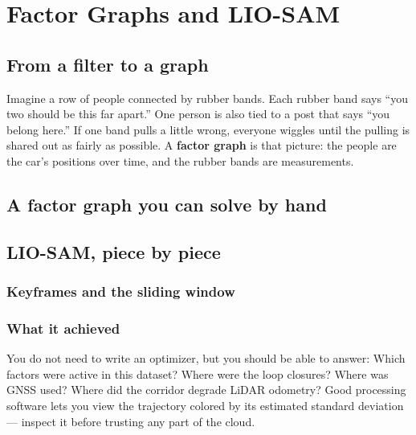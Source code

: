 \chapter{Factor Graphs and LIO-SAM}

\section{From a filter to a graph}

\begin{kid}
Imagine a row of people connected by rubber bands. Each rubber band says ``you two should be this far apart.'' One person is also tied to a post that says ``you belong here.'' If one band pulls a little wrong, everyone wiggles until the pulling is shared out as fairly as possible. A \textbf{factor graph} is that picture: the people are the car's positions over time, and the rubber bands are measurements.
\end{kid}


\section{A factor graph you can solve by hand}


\section{LIO-SAM, piece by piece}

\subsection{Keyframes and the sliding window}


\subsection{What it achieved}

\begin{tip}
You do not need to write an optimizer, but you should be able to answer: Which factors were active in this dataset? Where were the loop closures? Where was GNSS used? Where did the corridor degrade LiDAR odometry? Good processing software lets you view the trajectory colored by its estimated standard deviation --- inspect it before trusting any part of the cloud.
\end{tip}

